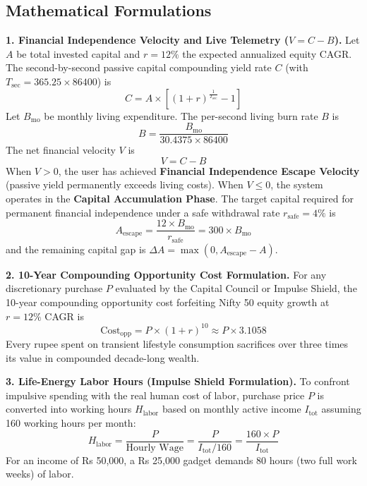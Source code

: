 \documentclass[12pt,a4paper]{report}
\begin{document}
\subsection{Mathematical Formulations}\label{s422}

\textbf{1. Financial Independence Velocity and Live Telemetry ($V = C - B$).}
Let $A$ be total invested capital and $r = 12\%$ the expected annualized equity CAGR. The second-by-second passive capital compounding yield rate $C$ (with $T_{\text{sec}} = 365.25 \times 86400$) is
\begin{equation}
C = A \times \left[(1 + r)^{\frac{1}{T_{\text{sec}}}} - 1\right]
\end{equation}
Let $B_{\text{mo}}$ be monthly living expenditure. The per-second living burn rate $B$ is
\begin{equation}
B = \frac{B_{\text{mo}}}{30.4375 \times 86400}
\end{equation}
The net financial velocity $V$ is
\begin{equation}
V = C - B
\end{equation}
When $V > 0$, the user has achieved \textbf{Financial Independence Escape Velocity} (passive yield permanently exceeds living costs). When $V \le 0$, the system operates in the \textbf{Capital Accumulation Phase}. The target capital required for permanent financial independence under a safe withdrawal rate $r_{\text{safe}} = 4\%$ is
\begin{equation}
A_{\text{escape}} = \frac{12 \times B_{\text{mo}}}{r_{\text{safe}}} = 300 \times B_{\text{mo}}
\end{equation}
and the remaining capital gap is $\Delta A = \max\left(0, A_{\text{escape}} - A\right)$.

\textbf{2. 10-Year Compounding Opportunity Cost Formulation.}
For any discretionary purchase $P$ evaluated by the Capital Council or Impulse Shield, the 10-year compounding opportunity cost forfeiting Nifty 50 equity growth at $r = 12\%$ CAGR is
\begin{equation}
\text{Cost}_{\text{opp}} = P \times (1 + r)^{10} \approx P \times 3.1058
\end{equation}
Every rupee spent on transient lifestyle consumption sacrifices over three times its value in compounded decade-long wealth.

\textbf{3. Life-Energy Labor Hours (Impulse Shield Formulation).}
To confront impulsive spending with the real human cost of labor, purchase price $P$ is converted into working hours $H_{\text{labor}}$ based on monthly active income $I_{\text{tot}}$ assuming 160 working hours per month:
\begin{equation}
H_{\text{labor}} = \frac{P}{\text{Hourly Wage}} = \frac{P}{I_{\text{tot}} / 160} = \frac{160 \times P}{I_{\text{tot}}}
\end{equation}
For an income of Rs 50,000, a Rs 25,000 gadget demands 80 hours (two full work weeks) of labor.
\end{document}
